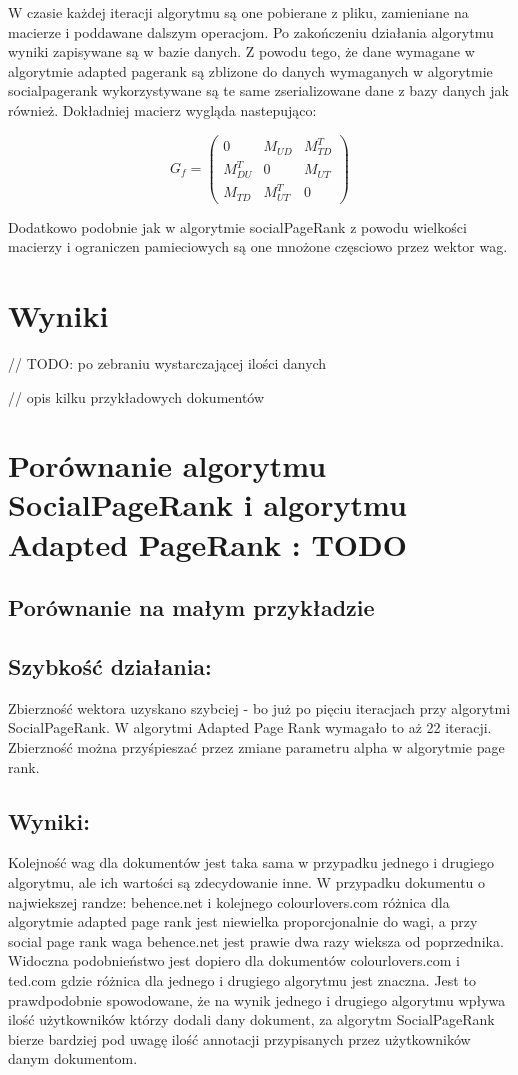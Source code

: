 W czasie każdej iteracji algorytmu są one pobierane z pliku, zamieniane na macierze i poddawane dalszym operacjom. Po zakończeniu działania algorytmu wyniki zapisywane są w bazie danych.
Z powodu  tego, że dane wymagane w algorytmie adapted pagerank są zblizone do danych wymaganych w algorytmie socialpagerank wykorzystywane są te same zserializowane dane z bazy danych jak również. Dokładniej macierz wygląda nastepująco:

\[
 G_f =
 \begin{pmatrix}
  0                     & M_{UD}       & M_{TD}^T \\
  M_{DU}^T  & 0                     & M_{UT}     \\
  M_{TD}       & M_{UT}^T   & 0 
 \end{pmatrix}
\]

Dodatkowo podobnie jak w algorytmie socialPageRank z powodu wielkości macierzy i ograniczen pamieciowych są one mnożone częsciowo przez wektor wag. 

\section{Wyniki}
// TODO: po zebraniu wystarczającej ilości danych

// opis kilku przykładowych dokumentów

\section{Porównanie algorytmu SocialPageRank i algorytmu Adapted PageRank : TODO }

\subsection{Porównanie na małym przykładzie }

\subsection*{Szybkość działania:}
Zbierzność wektora uzyskano szybciej - bo już po pięciu iteracjach przy algorytmi SocialPageRank. W algorytmi Adapted Page Rank wymagało to aż 22 iteracji. Zbierzność można przyśpieszać przez zmiane parametru alpha w algorytmie page rank.

\subsection*{Wyniki:}
Kolejność wag dla dokumentów jest taka sama w przypadku jednego i drugiego algorytmu, ale ich wartości są zdecydowanie inne. W przypadku dokumentu o najwiekszej randze: behence.net i kolejnego colourlovers.com różnica dla algorytmie adapted page rank jest niewielka proporcjonalnie do wagi, a przy social page rank waga behence.net jest prawie dwa razy wieksza od poprzednika. Widoczna podobnieństwo jest dopiero dla dokumentów colourlovers.com i ted.com gdzie różnica dla jednego i drugiego algorytmu jest znaczna. Jest to prawdpodobnie spowodowane, że na wynik jednego i drugiego algorytmu wpływa ilość użytkowników którzy dodali dany dokument, za algorytm SocialPageRank bierze bardziej pod uwagę ilość annotacji przypisanych przez użytkowników danym dokumentom.

